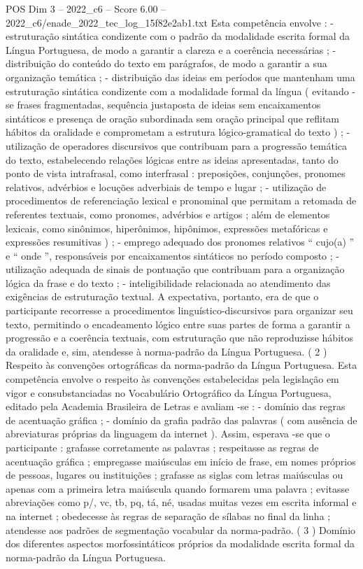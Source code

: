 \begin{textsample}{POS Dim 3 – 2022\_c6 – Score 6.00 – 2022\_c6/enade\_2022\_tec\_log\_15f82e2ab1.txt}
Esta competência envolve : - estruturação sintática condizente com o padrão da modalidade escrita formal da Língua Portuguesa, de modo a garantir a clareza e a coerência necessárias ; - distribuição do conteúdo do texto em parágrafos, de modo a garantir a sua organização temática ; - distribuição das ideias em períodos que mantenham uma estruturação sintática condizente com a modalidade formal da língua ( evitando -se frases fragmentadas, sequência justaposta de ideias sem encaixamentos sintáticos e presença de oração subordinada sem oração principal que reflitam hábitos da oralidade e comprometam a estrutura lógico-gramatical do texto ) ; - utilização de operadores discursivos que contribuam para a progressão temática do texto, estabelecendo relações lógicas entre as ideias apresentadas, tanto do ponto de vista intrafrasal, como interfrasal : preposições, conjunções, pronomes relativos, advérbios e locuções adverbiais de tempo e lugar ; - utilização de procedimentos de referenciação lexical e pronominal que permitam a retomada de referentes textuais, como pronomes, advérbios e artigos ; além de elementos lexicais, como sinônimos, hiperônimos, hipônimos, expressões metafóricas e expressões resumitivas ) ; - emprego adequado dos pronomes relativos “ cujo(a) ” e “ onde ”, responsáveis por encaixamentos sintáticos no período composto ; - utilização adequada de sinais de pontuação que contribuam para a organização lógica da frase e do texto ; - inteligibilidade relacionada ao atendimento das exigências de estruturação textual.
A expectativa, portanto, era de que o participante recorresse a procedimentos linguístico-discursivos para organizar seu texto, permitindo o encadeamento lógico entre suas partes de forma a garantir a progressão e a coerência textuais, com estruturação que não reproduzisse hábitos da oralidade e, sim, atendesse à norma-padrão da Língua Portuguesa. ( 2 ) Respeito às convenções ortográficas da norma-padrão da Língua Portuguesa.
Esta competência envolve o respeito às convenções estabelecidas pela legislação em vigor e consubstanciadas no Vocabulário Ortográfico da Língua Portuguesa, editado pela Academia Brasileira de Letras e avaliam -se : - domínio das regras de acentuação gráfica ; - domínio da grafia padrão das palavras ( com ausência de abreviaturas próprias da linguagem da internet ).
Assim, esperava -se que o participante : grafasse corretamente as palavras ; respeitasse as regras de acentuação gráfica ; empregasse maiúsculas em início de frase, em nomes próprios de pessoas, lugares ou instituições ; grafasse as siglas com letras maiúsculas ou apenas com a primeira letra maiúscula quando formarem uma palavra ; evitasse abreviações como p/, vc, tb, pq, tá, né, usadas muitas vezes em escrita informal e na internet ; obedecesse às regras de separação de sílabas no final da linha ; atendesse aos padrões de segmentação vocabular da norma-padrão. ( 3 ) Domínio dos diferentes aspectos morfossintáticos próprios da modalidade escrita formal da norma-padrão da Língua Portuguesa.

\end{textsample}
